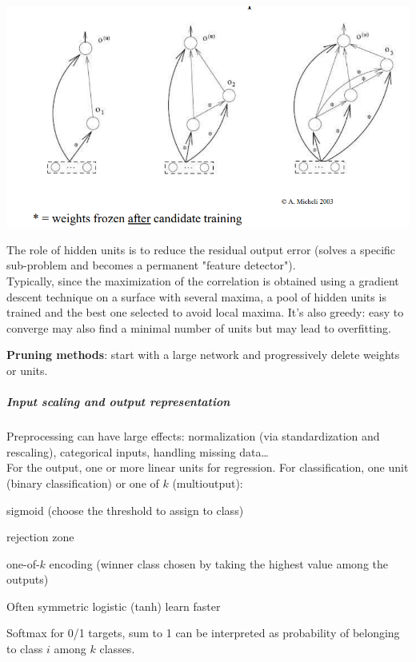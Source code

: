 \documentclass[10pt]{report}
\begin{document}
\begin{list}{}{}
\begin{list}{}{}
		\begin{center}
			\includegraphics[scale=0.5]{9.png}
		\end{center}
		The role of hidden units is to reduce the residual output error (solves a specific sub-problem and becomes a permanent "feature detector").\\
		Typically, since the maximization of the correlation is obtained using a gradient descent technique on a surface with several maxima, a pool of hidden units is trained and the best one selected to avoid local maxima. It's also greedy: easy to converge may also find a minimal number of units but may lead to overfitting.
\end{list}
	\item \textbf{Pruning methods}: start with a large network and progressively delete weights or units.
\end{list}
\subparagraph{Input scaling and output representation} Preprocessing can have large effects: normalization (via standardization and rescaling), categorical inputs, handling missing data\ldots\\
For the output, one or more linear units for regression. For classification, one unit (binary classification) or one of $k$ (multioutput):
\begin{list}{}{}
	\item sigmoid (choose the threshold to assign to class)
	\item rejection zone
	\item one-of-$k$ encoding (winner class chosen by taking the highest value among the outputs)
	\item Often symmetric logistic (tanh) learn faster
	\item Softmax for 0/1 targets, sum to 1 can be interpreted as probability of belonging to class $i$ among $k$ classes.
\end{list}
\end{document}
